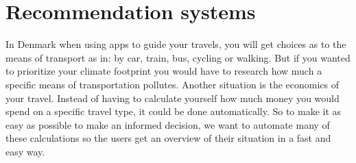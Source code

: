 \section{Recommendation systems}\label{sec:recommendation-systems}

In Denmark when using apps to guide your travels, you will get choices as to the means of transport as in: by car,
train, bus, cycling or walking.
But if you wanted to prioritize your climate footprint you would have to research how much a specific means of
transportation pollutes.
Another situation is the economics of your travel.
Instead of having to calculate yourself how much money you would spend on a specific travel type, it could be done
automatically.
So to make it as easy as possible to make an informed decision, we want to automate many of these calculations so the
users get an overview of their situation in a fast and easy way.

